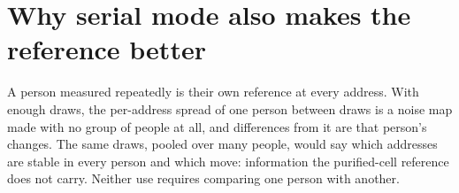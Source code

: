 \section{Why serial mode also makes the reference better}

A person measured repeatedly is their own reference at every address. With enough draws, the per-address spread of one person between draws is a noise map made
with no group of people at all, and differences from it are that person's changes. The same draws, pooled over many people, would say which addresses are stable in
every person and which move: information the purified-cell reference does not carry. Neither use requires comparing one person with another.

